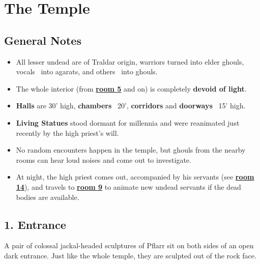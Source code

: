 \documentclass[english,11pt,openany,letterpaper,twocolumn]{book}
\begin{document}
\skipline[0pt]

\noindent
\begin{minipage}{\textwidth}
	\setmonofont{TruetypewriterPolyglOTT}
	\renewcommand{\FancyVerbFormatLine}[1]{\vspace*{-0.5ex}#1}
	{\hfill
	\hfill}
\end{minipage}

\vfill
\break


\chapter{The Temple}

\section{General Notes}

\begin{itemize}[leftmargin=*]
\item
All lesser undead are of Traldar origin, warriors turned into elder ghouls, vocals \dash\ into agarats, and others \dash\ into ghouls.
\item
The whole interior (from \hyperlink{room5}{\textbf{room 5}} and on) is completely \textbf{devoid of light}.
\item
\textbf{Halls} are 30' high, \textbf{chambers} \dash\ 20', \textbf{corridors} and \textbf{doorways} \dash\ 15' high.
\item
\textbf{Living Statues} stood dormant for millennia and were reanimated just recently by the high priest's will.
\item
No random encounters happen in the temple, but ghouls from the nearby rooms can hear loud noises and come out to investigate.
\item
At night, the high priest comes out, accompanied by his servants (see \hyperlink{room14}{\textbf{room 14}}), and travels to \hyperlink{room9}{\textbf{room 9}} to animate new undead servants if the dead bodies are available.
\end{itemize}


\hypertarget{room1}{}
\section{1. Entrance}

A pair of colossal jackal-headed sculptures of Pflarr sit on both sides of an open dark entrance. Just like the whole temple, they are sculpted out of the rock face.
\end{document}
